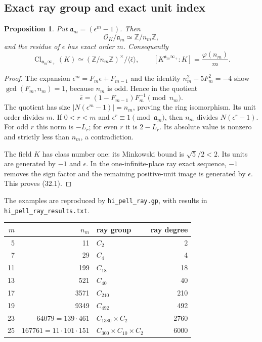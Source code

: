 \documentclass[11pt,reqno]{amsart}
\theoremstyle{plain}
\newtheorem{proposition}[theorem]{Proposition}
\begin{document}
\subsection{Exact ray group and exact unit index}\label{sec:32.1}

\begin{proposition}
Put \(\mathfrak a_m=(\epsilon^m-1)\). Then
\[
 \mathcal O_K/\mathfrak a_m\simeq\mathbb Z/n_m\mathbb Z,
\]
and the residue of \(\epsilon\) has exact order \(m\). Consequently
\begin{equation*}
 \boxed{
 \operatorname{Cl}_{\mathfrak a_m\infty_+}(K)
 \simeq(\mathbb Z/n_m\mathbb Z)^\times/\langle\bar\epsilon\rangle,
 \qquad
 [K^{\mathfrak a_m\infty_+}:K]=\frac{\varphi(n_m)}m.
 }
 \tag{32.1}
\end{equation*}
\end{proposition}

\begin{proof}
The expansion
\(\epsilon^m=F_m\epsilon+F_{m-1}\) and the identity
\(n_m^2-5F_m^2=-4\) show \(\gcd(F_m,n_m)=1\), because \(n_m\)
is odd. Hence in the quotient
\[
 \bar\epsilon=(1-F_{m-1})F_m^{-1}\pmod{n_m}.
\]
The quotient has size \(|N(\epsilon^m-1)|=n_m\), proving the ring
isomorphism. Its unit order divides \(m\). If
\(0<r<m\) and \(\epsilon^r\equiv1\pmod{\mathfrak a_m}\), then
\(n_m\) divides \(N(\epsilon^r-1)\). For odd \(r\) this norm is
\(-L_r\); for even \(r\) it is \(2-L_r\). Its absolute value is
nonzero and strictly less than \(n_m\), a contradiction.

The field \(K\) has class number one: its Minkowski bound is
\(\sqrt5/2<2\). Its units are generated by \(-1\) and \(\epsilon\).
In the one-infinite-place ray exact sequence, \(-1\) removes the
sign factor and the remaining positive-unit image is generated by
\(\bar\epsilon\). This proves (32.1).
\end{proof}

The examples are reproduced by \texttt{hi\_\allowbreak pell\_\allowbreak ray.gp}, with
results in \texttt{hi\_\allowbreak pell\_\allowbreak ray\_\allowbreak results.txt}.

\begin{center}\small
\begin{tabular}{@{}rrlr@{}}
\toprule
\(m\) & \(n_m\) & ray group & ray degree \\
\midrule
5 & 11 & \(C_2\) & 2 \\
7 & 29 & \(C_4\) & 4 \\
11 & 199 & \(C_{18}\) & 18 \\
13 & 521 & \(C_{40}\) & 40 \\
17 & 3571 & \(C_{210}\) & 210 \\
19 & 9349 & \(C_{492}\) & 492 \\
23 & \(64079=139\cdot461\) & \(C_{1380}\times C_2\) & 2760 \\
25 & \(167761=11\cdot101\cdot151\) & \(C_{300}\times C_{10}\times C_2\) & 6000 \\
\bottomrule
\end{tabular}
\end{center}
\end{document}
